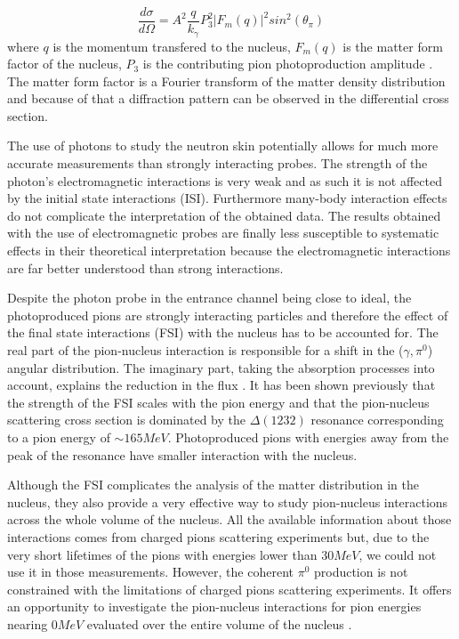 \begin{equation}
\frac{d\sigma}{d\Omega}=A^{2} \frac{q}{k_{\gamma}} P^{2}_{3} |F_{m}(q)|^{2} sin^{2}(\theta_{\pi})
\end{equation}
where $q$ is the momentum transfered to the nucleus, $F_{m}(q)$ is the matter form factor of the nucleus, $P_{3}$ is the contributing pion photoproduction amplitude \cite{ericsson}. The matter form factor is a Fourier transform of the matter density distribution and because of that a diffraction pattern can be observed in the differential cross section.

\indent The use of photons to study the neutron skin potentially allows for much more accurate measurements than strongly interacting probes. The strength of the photon's electromagnetic interactions is very weak and as such it is not affected by the initial state interactions (ISI). Furthermore many-body interaction effects do not complicate the interpretation of the obtained data. The results obtained with the use of electromagnetic probes are finally less susceptible to systematic effects in their theoretical interpretation \cite{claire} because  the electromagnetic interactions are far better understood than strong interactions.

\indent Despite the photon probe in the entrance channel being close to ideal, the photoproduced pions are strongly interacting particles and therefore the effect of the final state interactions (FSI) with the nucleus has to be accounted for. The real part of the pion-nucleus interaction is responsible for a shift in the ($\gamma,\pi^{0}$) angular distribution. The imaginary part, taking the absorption processes into account, explains the reduction in the flux \cite{ericsson}. It has been shown previously that the strength of the FSI scales with the pion energy and that the pion-nucleus scattering cross section is dominated by the $\Delta(1232)$ resonance corresponding to a pion energy of $\sim165MeV$. Photoproduced pions with energies away from the peak of the resonance have smaller interaction with the nucleus. 

\indent Although the FSI complicates the analysis of the matter distribution in the nucleus, they also provide a very effective way to study pion-nucleus interactions across the whole volume of the nucleus. All the available information about those interactions comes from charged pions scattering experiments but, due to the very short lifetimes of the pions with energies lower than $30MeV$, we could not use it in those measurements. However, the coherent $\pi^{0}$ production is not constrained with the limitations of charged pions scattering experiments. It offers an opportunity to investigate the pion-nucleus interactions for pion energies nearing $0MeV$ evaluated over the entire volume of the nucleus \cite{claire}.

